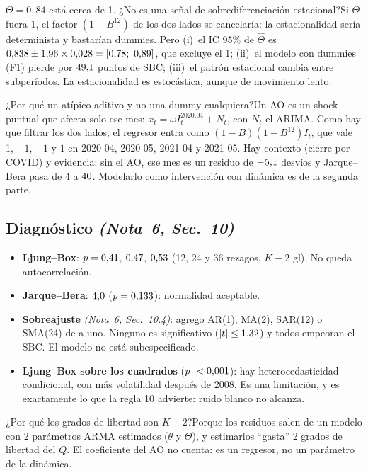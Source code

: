 \documentclass[11pt,a4paper]{article}
\newcommand{\nota}[2]{\textit{(Nota~#1, Sec.~#2)}}
\newcommand{\Q}[2]{\begin{pregunta}{#1}#2\end{pregunta}}
\begin{document}
\Q{$\Theta=0{,}84$ est\'a cerca de 1. ¿No es una se\~nal de sobrediferenciaci\'on estacional?}{Si $\Theta$ fuera 1, el factor $(1-B^{12})$ de los dos lados se cancelar\'ia: la estacionalidad ser\'ia determinista y bastar\'ian dummies. Pero (i)~el IC 95\% de $\hat\Theta$ es $0{,}838\pm1{,}96\times0{,}028=[0{,}78;\ 0{,}89]$, que excluye el 1; (ii)~el modelo con dummies (F1) pierde por $49{,}1$ puntos de SBC; (iii)~el patr\'on estacional cambia entre subper\'iodos. La estacionalidad es estoc\'astica, aunque de movimiento lento.}

\Q{¿Por qu\'e un at\'ipico aditivo y no una dummy cualquiera?}{Un AO es un shock puntual que afecta solo ese mes: $x_t=\omega I_t^{2020.04}+N_t$, con $N_t$ el ARIMA. Como hay que filtrar los dos lados, el regresor entra como $(1-B)(1-B^{12})I_t$, que vale 1, $-1$, $-1$ y $1$ en 2020-04, 2020-05, 2021-04 y 2021-05. Hay contexto (cierre por COVID) y evidencia: sin el AO, ese mes es un residuo de $-5{,}1$ desv\'ios y Jarque--Bera pasa de 4 a $40$. Modelarlo como intervenci\'on con din\'amica es de la segunda parte.}

\subsection{Diagn\'ostico \nota{6}{10}}
\begin{itemize}
\item \textbf{Ljung--Box}: $p=0{,}41$, $0{,}47$, $0{,}53$ (12, 24 y 36 rezagos, $K-2$ gl). No queda autocorrelaci\'on.
\item \textbf{Jarque--Bera}: $4{,}0$ ($p=0{,}133$): normalidad aceptable.
\item \textbf{Sobreajuste} \nota{6}{10.4}: agrego AR(1), MA(2), SAR(12) o SMA(24) de a uno. Ninguno es significativo ($|t|\le1{,}32$) y todos empeoran el SBC. El modelo no est\'a subespecificado.
\item \textbf{Ljung--Box sobre los cuadrados} ($p\ <0{,}001$): hay heterocedasticidad condicional, con m\'as volatilidad despu\'es de 2008. Es una limitaci\'on, y es exactamente lo que la regla 10 advierte: ruido blanco no alcanza.
\end{itemize}

\Q{¿Por qu\'e los grados de libertad son $K-2$?}{Porque los residuos salen de un modelo con 2 par\'ametros ARMA estimados ($\theta$ y $\Theta$), y estimarlos ``gasta'' 2 grados de libertad del $Q$. El coeficiente del AO no cuenta: es un regresor, no un par\'ametro de la din\'amica.}
\end{document}
